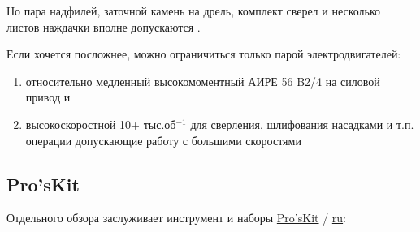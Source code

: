 \documentclass{magazine}
\begin{document}
\begin{multicols}{2}
Но пара надфилей, заточной камень на дрель, комплект сверел и несколько листов
наждачки вполне допускаются \smiley.

Если хочется посложнее, можно ограничиться только парой электродвигателей:
\begin{enumerate}
  \item 
относительно медленный высокомоментный АИРЕ 56 B2/4 на силовой привод и
\item 
высокоскоростной 10+ тыс.об$^{-1}$ для сверления, шлифования насадками и т.п.
операции допускающие работу с большими скоростями

\end{enumerate}


\end{multicols}

\subsection{Pro'sKit}

Отдельного обзора заслуживает инструмент и наборы
\href{http://www.proskit.com/}{Pro'sKit}
 / \href{http://www.proskit.msk.ru/index.html}{ru}:
\end{document}
